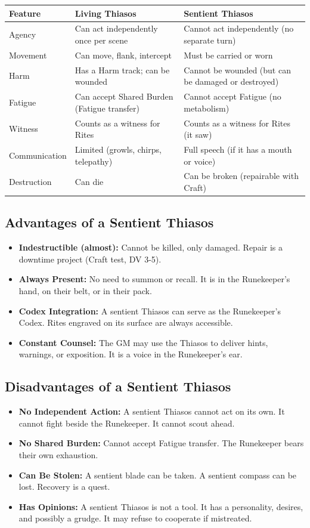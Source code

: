 \begin{tabular}{lll}
\textbf{Feature} & \textbf{Living Thiasos} & \textbf{Sentient Thiasos} \\
\hline
Agency & Can act independently once per scene & Cannot act independently (no separate turn) \\
Movement & Can move, flank, intercept & Must be carried or worn \\
Harm & Has a Harm track; can be wounded & Cannot be wounded (but can be damaged or destroyed) \\
Fatigue & Can accept Shared Burden (Fatigue transfer) & Cannot accept Fatigue (no metabolism) \\
Witness & Counts as a witness for Rites & Counts as a witness for Rites (it saw) \\
Communication & Limited (growls, chirps, telepathy) & Full speech (if it has a mouth or voice) \\
Destruction & Can die & Can be broken (repairable with Craft) \\
\end{tabular}

\subsection{Advantages of a Sentient Thiasos}

\begin{itemize}
\item \textbf{Indestructible (almost):} Cannot be killed, only damaged. Repair is a downtime project (Craft test, DV 3-5).
\item \textbf{Always Present:} No need to summon or recall. It is in the Runekeeper's hand, on their belt, or in their pack.
\item \textbf{Codex Integration:} A sentient Thiasos can serve as the Runekeeper's Codex. Rites engraved on its surface are always accessible.
\item \textbf{Constant Counsel:} The GM may use the Thiasos to deliver hints, warnings, or exposition. It is a voice in the Runekeeper's ear.
\end{itemize}

\subsection{Disadvantages of a Sentient Thiasos}

\begin{itemize}
\item \textbf{No Independent Action:} A sentient Thiasos cannot act on its own. It cannot fight beside the Runekeeper. It cannot scout ahead.
\item \textbf{No Shared Burden:} Cannot accept Fatigue transfer. The Runekeeper bears their own exhaustion.
\item \textbf{Can Be Stolen:} A sentient blade can be taken. A sentient compass can be lost. Recovery is a quest.
\item \textbf{Has Opinions:} A sentient Thiasos is not a tool. It has a personality, desires, and possibly a grudge. It may refuse to cooperate if mistreated.
\end{itemize}

